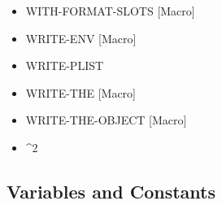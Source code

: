 \documentclass [11pt]{book}
\begin{document}
\begin{itemize}
\item {}WITH-FORMAT-SLOTS [Macro]





\item {}WRITE-ENV [Macro]





\item {}WRITE-PLIST





\item {}WRITE-THE [Macro]





\item {}WRITE-THE-OBJECT [Macro]





\item {}^2





\end{itemize}



\subsection{Variables and Constants}

\label{subsec:variablesandconstants}
\end{document}
